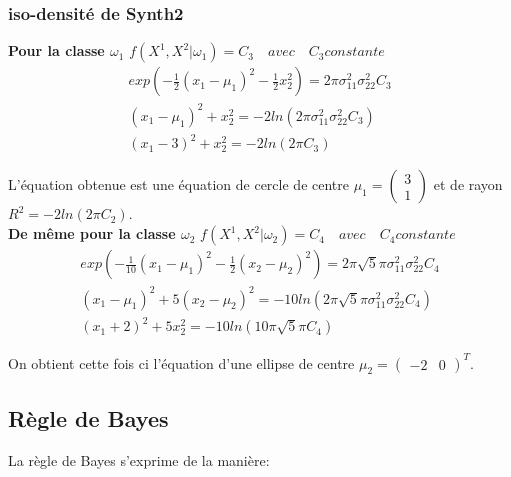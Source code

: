 \documentclass[10pt]{article}
\begin{document}
\subsubsection{iso-densité de Synth2}
\textbf{Pour la classe $\omega_{1}$} $f(X^{1}, X^{2}|\omega_{1}) = C_{3} \quad avec \quad C_{3} constante$
\begin{equation}
\begin{split}
exp(-\frac{1}{2} (x_{1}-\mu_{1})^{2} - \frac{1}{2}x_{2}^{2})  = 2 \pi \sigma_{11}^{2} \sigma_{22}^{2} C_{3}
\\
(x_{1} - \mu_{1})^{2} +  x_{2}^{2} = -2ln(2 \pi \sigma_{11}^{2} \sigma_{22}^{2} C_{3})
\\
(x_{1} - 3)^{2} + x_{2}^{2} = -2 ln(2\pi C_{3})
\end{split}
\label{9}
\end{equation}

L'équation obtenue est une équation de cercle de centre $\mu_{1} = \begin{pmatrix} 3 \\ 1\end{pmatrix} $ et de rayon $R^{2} = -2 ln(2\pi C_{2})$.\\

\textbf{De même pour la classe $\omega_{2}$} $f(X^{1}, X^{2}|\omega_{2}) = C_{4} \quad avec \quad C_{4} constante$
\begin{equation}
\begin{split}
exp(-\frac{1}{10} (x_{1}-\mu_{1})^{2} - \frac{1}{2}(x_{2}-\mu_{2})^{2})  = 2\pi\sqrt{5} \pi \sigma_{11}^{2} \sigma_{22}^{2} C_{4}
\\
(x_{1} - \mu_{1})^{2} +  5(x_{2}-\mu_{2})^{2}  = -10ln(2\pi\sqrt{5}  \pi \sigma_{11}^{2} \sigma_{22}^{2} C_{4})
\\
(x_{1} + 2)^{2} + 5x_{2}^{2} = -10ln(10\pi\sqrt{5}\pi C_{4})
\label{10}
\end{split}
\end{equation}

On obtient cette fois ci l'équation d'une ellipse de centre $\mu_{2} = \begin{pmatrix} -2 & 0\end{pmatrix}^{T}$.

\subsection{Règle de Bayes}
La règle de Bayes s'exprime de la manière:
\end{document}
